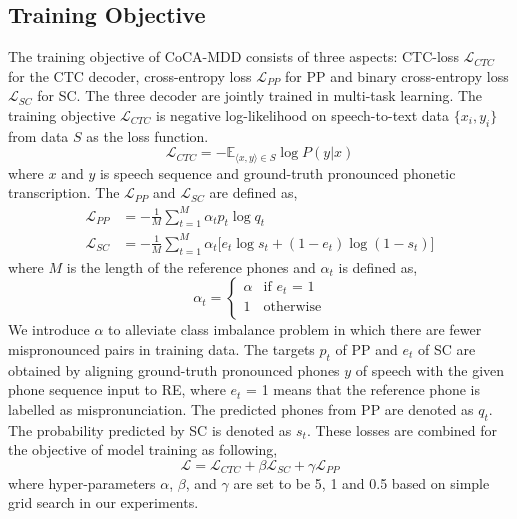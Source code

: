 \documentclass[a4paper]{article}
\begin{document}
\subsection{Training Objective}
The training objective of CoCA-MDD consists of three aspects: CTC-loss $\mathcal{L}_{CTC}$ \cite{Alex2006CONNECTION} for the CTC decoder, cross-entropy loss $\mathcal{L}_{PP}$ for PP and binary cross-entropy loss $\mathcal{L}_{SC}$ for SC. The three decoder are jointly trained in multi-task learning. 
The training objective $\mathcal{L}_{CTC}$ is negative log-likelihood on speech-to-text data $\{x_i, y_i\}$ from data $S$ as the loss function.
\begin{equation}
    \mathcal{L}_{CTC} = - \mathbb{E}_{\langle x,y \rangle \in S} \log P(y|x)
\end{equation}
\noindent where $x$ and $y$ is speech sequence and ground-truth pronounced  phonetic transcription. The $\mathcal{L}_{PP}$ and $\mathcal{L}_{SC}$ are defined as,
\begin{align}
    \mathcal{L}_{PP} &= -\frac{1}{M} \sum_{t=1}^{M}\alpha_t p_{t}\log q_{t}\label{eqn:ce} \\
    \mathcal{L}_{SC} &= -\frac{1}{M}\sum_{t=1}^{M} \alpha_t \bigg[e_t\log s_t + (1-e_t)\log (1-s_t)\bigg] \label{eqn:bce}
\end{align}
\noindent where $M$ is the length of the reference phones and $\alpha_t$ is defined as,
\begin{equation}
    \alpha_t = \begin{cases} 
    \alpha & \text{if $e_t$ = 1} \\
    1 & \text{otherwise} \\
    \end{cases}
\end{equation}
\noindent We introduce $\alpha$ to alleviate class imbalance problem in which there are fewer mispronounced pairs in training data. The targets $p_t$ of PP and $e_t$ of SC are obtained by aligning ground-truth pronounced phones $y$ of speech with the given phone sequence input to RE, where $e_t$ = 1 means that the reference phone is labelled as mispronunciation. The predicted phones from PP are denoted as $q_t$. The probability predicted by SC is denoted as $s_t$. These losses are combined for the objective of model training as following,
\begin{equation}
    \mathcal{L} = \mathcal{L}_{CTC} + \beta \mathcal{L}_{SC} + \gamma \mathcal{L}_{PP} \label{eqn:totalloss}
\end{equation}
where hyper-parameters $\alpha$, $\beta$, and $\gamma$ are set to be 5, 1 and 0.5 based on simple grid search in our experiments.
\end{document}
